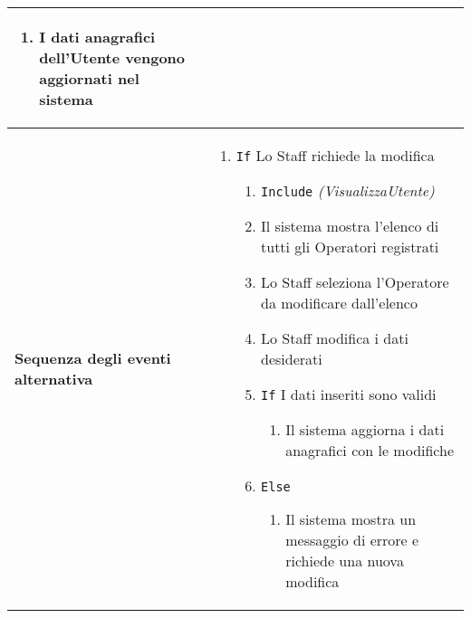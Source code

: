 \documentclass[a4paper]{report}
\begin{document}
\begin{table}[H]
\begin{tabular}{|p{3.9cm}|p{9.9cm}|}
\begin{enumerate}[leftmargin=14pt,label=\arabic*.,labelsep=0.5em,topsep=0pt,partopsep=0pt,parsep=0pt,itemsep=0pt]
    \item I dati anagrafici dell’Utente vengono aggiornati nel sistema
    \end{enumerate} \\ \hline
\textbf{Sequenza degli eventi alternativa} & \begin{enumerate}[leftmargin=14pt,label=\arabic*.,labelsep=0.5em,topsep=0pt,partopsep=0pt,parsep=0pt,itemsep=0pt] 
    \item \texttt{If} Lo Staff richiede la modifica
    \begin{enumerate}[label=\arabic{enumi}.\arabic*.,leftmargin=22pt,labelsep=0.5em,topsep=0pt,partopsep=0pt,parsep=0pt,itemsep=0pt]
        \item \texttt{Include} \textit{(VisualizzaUtente)} 
        \item Il sistema mostra l’elenco di tutti gli Operatori registrati
        \item Lo Staff seleziona l’Operatore da modificare dall’elenco
        \item Lo Staff modifica i dati desiderati
        \item \texttt{If} I dati inseriti sono validi
        \begin{enumerate}[label=\arabic{enumi}.\arabic*.,leftmargin=22pt,labelsep=0.5em,topsep=0pt,partopsep=0pt,parsep=0pt,itemsep=0pt]
            \item Il sistema aggiorna i dati anagrafici con le modifiche
        \end{enumerate}
        \item \texttt{Else}
        \begin{enumerate}[label=\arabic{enumi}.\arabic*.,leftmargin=22pt,labelsep=0.5em,topsep=0pt,partopsep=0pt,parsep=0pt,itemsep=0pt]
            \item Il sistema mostra un messaggio di errore e richiede una nuova modifica
        \end{enumerate}
    \end{enumerate}
\end{enumerate}\\ \hline
\end{tabular}
\end{table}
\end{document}
